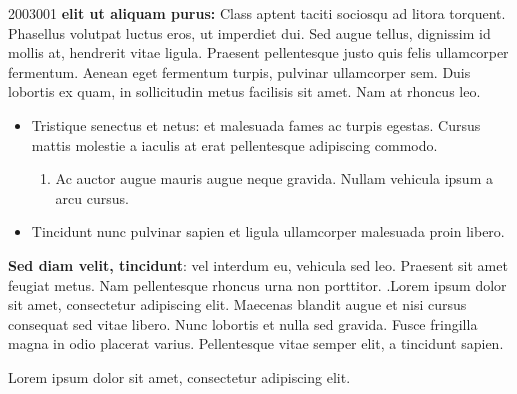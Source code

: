 \documentclass[]{article}
\begin{document}
{\Huge 2003001}\linebreak
\noindent
{\bf elit ut aliquam purus:} Class aptent taciti sociosqu ad litora torquent.
Phasellus volutpat luctus eros, ut imperdiet dui. 
Sed augue tellus, dignissim id mollis at, hendrerit vitae ligula. 
Praesent pellentesque justo quis felis ullamcorper fermentum. 
Aenean eget fermentum turpis, pulvinar ullamcorper sem. 
Duis lobortis ex quam, in sollicitudin metus facilisis sit amet. Nam at rhoncus leo.
\vspace{10pt}
\begin{itemize}
    \item Tristique senectus et netus: et malesuada fames ac turpis egestas.\linebreak
    Cursus mattis molestie a iaculis at erat pellentesque adipiscing commodo.
    \begin{enumerate}
        \item Ac auctor augue mauris augue neque gravida. Nullam vehicula ipsum a arcu cursus.
    \end{enumerate}
    \item Tincidunt nunc pulvinar sapien et ligula ullamcorper malesuada proin libero.
\end{itemize}
\vspace{5pt}

{\bf\large Sed diam velit, tincidunt}: vel interdum eu, vehicula sed leo. 
Praesent sit amet feugiat metus. Nam pellentesque rhoncus urna non porttitor. 
.Lorem ipsum dolor sit amet, consectetur adipiscing elit. 
Maecenas blandit augue et nisi cursus consequat sed vitae libero. 
Nunc lobortis et nulla sed gravida. Fusce fringilla magna in odio placerat varius. 
Pellentesque vitae semper elit, a tincidunt sapien.\linebreak
\begin{center}
Lorem ipsum dolor sit amet, consectetur adipiscing elit.
\end{center}
\end{document}
